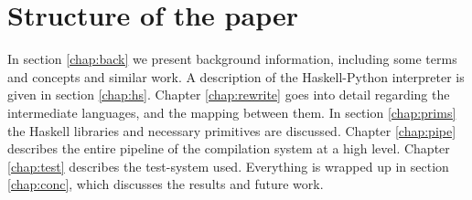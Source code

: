 

\section{Structure of the paper}
In section \ref{chap:back} we present background information, including 
some terms and concepts and similar work. 
%
A description of the 
Haskell-Python interpreter is given in section \ref{chap:hs}.
%
Chapter \ref{chap:rewrite} goes into detail regarding the intermediate 
languages, and the mapping between them.
%
In section \ref{chap:prims} the Haskell libraries and necessary primitives
are discussed.
%
Chapter \ref{chap:pipe} describes the entire pipeline of the compilation system 
at a high level.
%
Chapter \ref{chap:test} describes the test-system used.
%
Everything is wrapped up in section \ref{chap:conc}, which discusses the 
results and future work.
